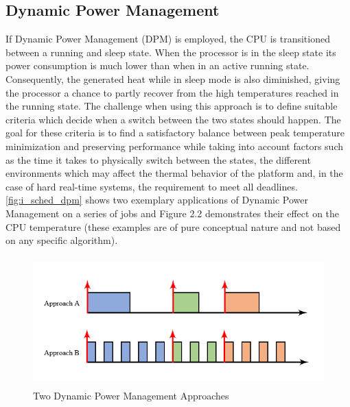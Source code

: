 \subsection{Dynamic Power Management}
If Dynamic Power Management (DPM) is employed, the CPU is transitioned between a running and sleep state. When the processor is in the sleep state its power consumption is much lower than when in an active running state. Consequently, the generated heat while in sleep mode is also diminished, giving the processor a chance to partly recover from the high temperatures reached in the running state. The challenge when using this approach is to define suitable criteria which decide when a switch between the two states should happen. The goal for these criteria is to find a satisfactory balance between peak temperature minimization and preserving performance while taking into account factors such as the time it takes to physically switch between the states, the different environments which may affect the thermal behavior of the platform and, in the case of hard real-time systems, the requirement to meet all deadlines. \autoref{fig:i_sched_dpm} shows two exemplary applications of Dynamic Power Management on a series of jobs and Figure 2.2 demonstrates their effect on the CPU temperature (these examples are of pure conceptual nature and not based on any specific algorithm).\\
\begin{figure}[htpb]
  \centering
  \includegraphics[height=5cm]{figures/dpm_sched}
  \caption[DPM Schedules]{Two Dynamic Power Management Approaches}\label{fig:i_sched_dpm}
\end{figure}

